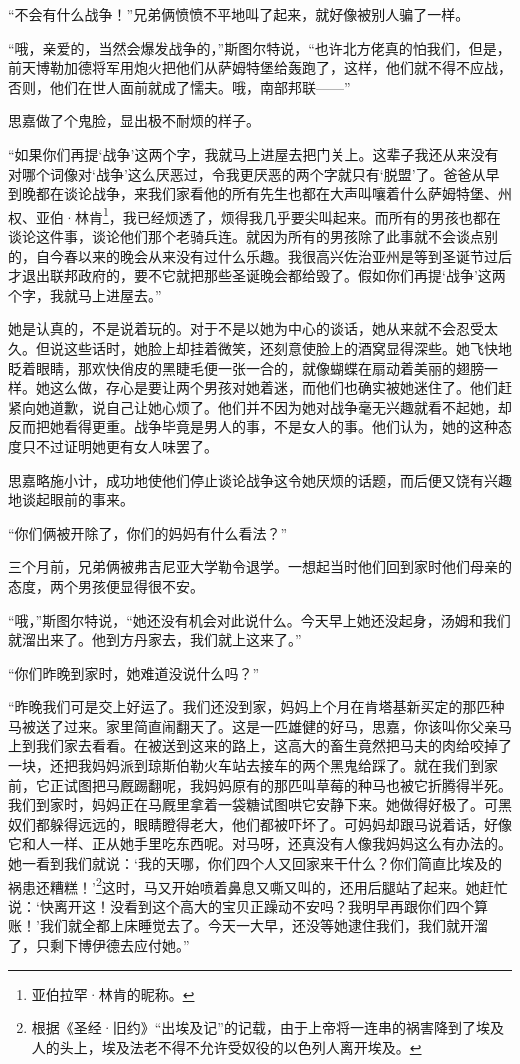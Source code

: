\par “不会有什么战争！”兄弟俩愤愤不平地叫了起来，就好像被别人骗了一样。
\par “哦，亲爱的，当然会爆发战争的，”斯图尔特说，“也许北方佬真的怕我们，但是，前天博勒加德将军用炮火把他们从萨姆特堡给轰跑了，这样，他们就不得不应战，否则，他们在世人面前就成了懦夫。哦，南部邦联——”
\par 思嘉做了个鬼脸，显出极不耐烦的样子。
\par “如果你们再提‘战争’这两个字，我就马上进屋去把门关上。这辈子我还从来没有对哪个词像对‘战争’这么厌恶过，令我更厌恶的两个字就只有‘脱盟’了。爸爸从早到晚都在谈论战争，来我们家看他的所有先生也都在大声叫嚷着什么萨姆特堡、州权、亚伯·林肯\footnote{亚伯拉罕·林肯的昵称。}，我已经烦透了，烦得我几乎要尖叫起来。而所有的男孩也都在谈论这件事，谈论他们那个老骑兵连。就因为所有的男孩除了此事就不会谈点别的，自今春以来的晚会从来没有过什么乐趣。我很高兴佐治亚州是等到圣诞节过后才退出联邦政府的，要不它就把那些圣诞晚会都给毁了。假如你们再提‘战争’这两个字，我就马上进屋去。”
\par 她是认真的，不是说着玩的。对于不是以她为中心的谈话，她从来就不会忍受太久。但说这些话时，她脸上却挂着微笑，还刻意使脸上的酒窝显得深些。她飞快地眨着眼睛，那欢快俏皮的黑睫毛便一张一合的，就像蝴蝶在扇动着美丽的翅膀一样。她这么做，存心是要让两个男孩对她着迷，而他们也确实被她迷住了。他们赶紧向她道歉，说自己让她心烦了。他们并不因为她对战争毫无兴趣就看不起她，却反而把她看得更重。战争毕竟是男人的事，不是女人的事。他们认为，她的这种态度只不过证明她更有女人味罢了。
\par 思嘉略施小计，成功地使他们停止谈论战争这令她厌烦的话题，而后便又饶有兴趣地谈起眼前的事来。
\par “你们俩被开除了，你们的妈妈有什么看法？”
\par 三个月前，兄弟俩被弗吉尼亚大学勒令退学。一想起当时他们回到家时他们母亲的态度，两个男孩便显得很不安。
\par “哦，”斯图尔特说，“她还没有机会对此说什么。今天早上她还没起身，汤姆和我们就溜出来了。他到方丹家去，我们就上这来了。”
\par “你们昨晚到家时，她难道没说什么吗？”
\par “昨晚我们可是交上好运了。我们还没到家，妈妈上个月在肯塔基新买定的那匹种马被送了过来。家里简直闹翻天了。这是一匹雄健的好马，思嘉，你该叫你父亲马上到我们家去看看。在被送到这来的路上，这高大的畜生竟然把马夫的肉给咬掉了一块，还把我妈妈派到琼斯伯勒火车站去接车的两个黑鬼给踩了。就在我们到家前，它正试图把马厩踢翻呢，我妈妈原有的那匹叫草莓的种马也被它折腾得半死。我们到家时，妈妈正在马厩里拿着一袋糖试图哄它安静下来。她做得好极了。可黑奴们都躲得远远的，眼睛瞪得老大，他们都被吓坏了。可妈妈却跟马说着话，好像它和人一样、正从她手里吃东西呢。对马呀，还真没有人像我妈妈这么有办法的。她一看到我们就说：‘我的天哪，你们四个人又回家来干什么？你们简直比埃及的祸患还糟糕！'\footnote{根据《圣经·旧约》“出埃及记”的记载，由于上帝将一连串的祸害降到了埃及人的头上，埃及法老不得不允许受奴役的以色列人离开埃及。}这时，马又开始喷着鼻息又嘶又叫的，还用后腿站了起来。她赶忙说：‘快离开这！没看到这个高大的宝贝正躁动不安吗？我明早再跟你们四个算账！’我们就全都上床睡觉去了。今天一大早，还没等她逮住我们，我们就开溜了，只剩下博伊德去应付她。”
